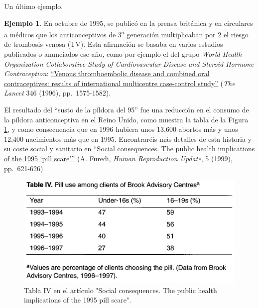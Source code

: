 \documentclass[
]{book}
\theoremstyle{definition}
\theoremstyle{definition}
\newtheorem{example}{Ejemplo}[chapter]
\theoremstyle{definition}
\theoremstyle{definition}
\theoremstyle{remark}
\begin{document}
Un último ejemplo.

\begin{example}
\protect\hypertarget{exm:pindolatr}{}\label{exm:pindolatr}En octubre de 1995, se publicó en la prensa británica y en circulares a médicos que los anticonceptivos de 3\textsuperscript{a} generación multiplicaban por 2 el riesgo de trombosis venosa (TV). Esta afirmación se basaba en varios estudios publicados o anunciados ese año, como por ejemplo el del grupo \emph{World Health Organization Collaborative Study of Cardiovascular Disease and Steroid Hormone Contraception}: \href{https://resourcelibrary.stfm.org/HigherLogic/System/DownloadDocumentFile.ashx?DocumentFileKey=01b7b448-119e-c8ac-d90a-800aaf096608\&forceDialog=0}{``Venous thromboembolic disease and combined oral contraceptives: results of international multicentre case-control study''} (\emph{The Lancet} 346 (1996), pp.~1575-1582).

El resultado del ``susto de la píldora del 95'' fue una reducción en el consumo de la píldora anticonceptiva en el Reino Unido, como muestra la tabla de la Figura \ref{fig:tableIV}, y como consecuencia que en 1996 hubiera unos 13,600 abortos más y unos 12,400 nacimientos más que en 1995. Encontraréis más detalles de esta historia y su coste social y sanitario en \href{https://academic.oup.com/humupd/article/5/6/621/745751}{``Social consequences. The public health implications of the 1995 `pill scare'''} (A. Furedi, \emph{Human Reproduction Update}, 5 (1999), pp.~621-626).
\end{example}

\begin{figure}

{\centering \includegraphics[width=0.8\linewidth]{INREMDN_files/figure-html/tableIV} 

}

\caption{Tabla IV en el artículo "Social consequences. The public health implications of the 1995 pill scare".}\label{fig:tableIV}
\end{figure}
\end{document}
